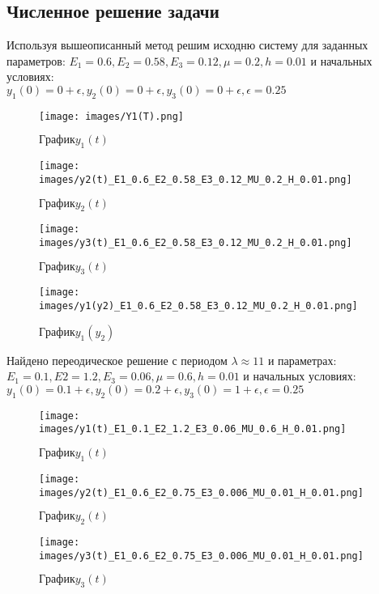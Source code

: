 \documentclass[a4paper,12pt,titlepage,finall]{article}
\begin{document}
\begin{itemize}
\section{Численное решение задачи}
Используя вышеописанный метод решим исходню систему для заданных параметров:
$E_1 = 0.6, E_2 = 0.58, E_3 = 0.12, \mu = 0.2, h = 0.01$ и начальных условиях: \\
$y_1(0) = 0 + \epsilon, y_2(0) = 0 + \epsilon, y_3(0)= 0 + \epsilon, \epsilon = 0.25$
\begin{figure}[h]
    \centering
    \texttt{[image: images/Y1(T).png]}
    \caption{$График y_1(t)$}
    \label{fig:my_label}
\end{figure} 
\begin{figure}[h]
    \centering
    \texttt{[image: images/y2(t)\_E1\_0.6\_E2\_0.58\_E3\_0.12\_MU\_0.2\_H\_0.01.png]}
    \caption{$График y_2(t)$}
    \label{fig:my_label}
\end{figure}
\newpage
\begin{figure}[h]
    \centering
    \texttt{[image: images/y3(t)\_E1\_0.6\_E2\_0.58\_E3\_0.12\_MU\_0.2\_H\_0.01.png]}
    \caption{$График y_3(t)$}
    \label{fig:my_label}
\end{figure}
\begin{figure}[h]
    \centering
    \texttt{[image: images/y1(y2)\_E1\_0.6\_E2\_0.58\_E3\_0.12\_MU\_0.2\_H\_0.01.png]}
    \caption{$График y_1(y_2)$}
    \label{fig:my_label}
\end{figure}
\newpage
Найдено переодическое решение с периодом $\lambda \approx 11$ и параметрах:
$E_1 = 0.1, E2 = 1.2, E_3 = 0.06, \mu = 0.6, h = 0.01$ и начальных условиях: \newline
$y_1(0) = 0.1 + \epsilon, y_2(0) = 0.2 + \epsilon, y_3(0)= 1 + \epsilon, \epsilon = 0.25$
\begin{figure}[h]
    \centering
    \texttt{[image: images/y1(t)\_E1\_0.1\_E2\_1.2\_E3\_0.06\_MU\_0.6\_H\_0.01.png]}
    \caption{$График y_1(t)$}
    \label{fig:my_label}
\end{figure}
\begin{figure}[h]
    \centering
    \texttt{[image: images/y2(t)\_E1\_0.6\_E2\_0.75\_E3\_0.006\_MU\_0.01\_H\_0.01.png]}
    \caption{$График y_2(t)$}
    \label{fig:my_label}
\end{figure}
\newpage
\begin{figure}[h]
    \centering
    \texttt{[image: images/y3(t)\_E1\_0.6\_E2\_0.75\_E3\_0.006\_MU\_0.01\_H\_0.01.png]}
    \caption{$График y_3(t)$}
    \label{fig:my_label}
\end{figure}

\end{itemize}
\end{document}
